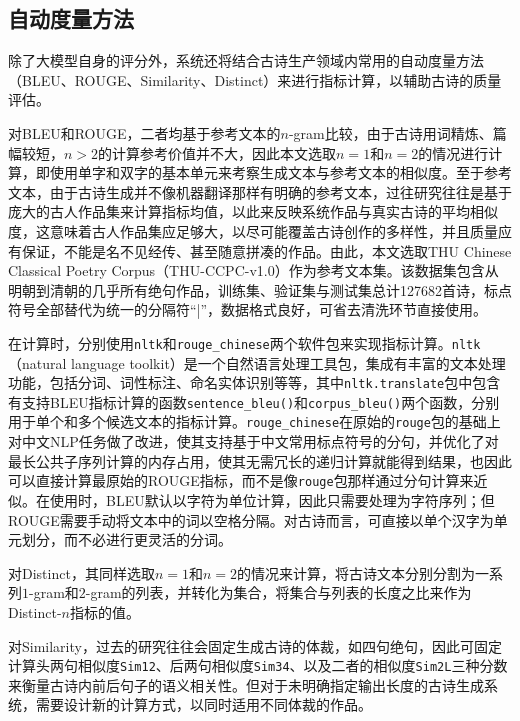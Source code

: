 \subsection{自动度量方法}

除了大模型自身的评分外，系统还将结合古诗生产领域内常用的自动度量方法（BLEU、ROUGE、Similarity、Distinct）来进行指标计算，以辅助古诗的质量评估。

对BLEU和ROUGE，二者均基于参考文本的$n$-gram比较，由于古诗用词精炼、篇幅较短，$n>2$的计算参考价值并不大，因此本文选取$n=1$和$n=2$的情况进行计算，即使用单字和双字的基本单元来考察生成文本与参考文本的相似度。至于参考文本，由于古诗生成并不像机器翻译那样有明确的参考文本，过往研究往往是基于庞大的古人作品集来计算指标均值，以此来反映系统作品与真实古诗的平均相似度，这意味着古人作品集应足够大，以尽可能覆盖古诗创作的多样性，并且质量应有保证，不能是名不见经传、甚至随意拼凑的作品。由此，本文选取THU Chinese Classical Poetry Corpus（THU-CCPC-v1.0）作为参考文本集。该数据集包含从明朝到清朝的几乎所有绝句作品，训练集、验证集与测试集总计127682首诗，标点符号全部替代为统一的分隔符“|”，数据格式良好，可省去清洗环节直接使用。

在计算时，分别使用\verb|nltk|和\verb|rouge_chinese|两个软件包来实现指标计算。\verb|nltk|（natural language toolkit）是一个自然语言处理工具包，集成有丰富的文本处理功能，包括分词、词性标注、命名实体识别等等，其中\verb|nltk.translate|包中包含有支持BLEU指标计算的函数\verb|sentence_bleu()|和\verb|corpus_bleu()|两个函数，分别用于单个和多个候选文本的指标计算。\verb|rouge_chinese|在原始的\verb|rouge|包的基础上对中文NLP任务做了改进，使其支持基于中文常用标点符号的分句，并优化了对最长公共子序列计算的内存占用，使其无需冗长的递归计算就能得到结果，也因此可以直接计算最原始的ROUGE指标，而不是像\verb|rouge|包那样通过分句计算来近似。在使用时，BLEU默认以字符为单位计算，因此只需要处理为字符序列；但ROUGE需要手动将文本中的词以空格分隔。对古诗而言，可直接以单个汉字为单元划分，而不必进行更灵活的分词。

对Distinct，其同样选取$n=1$和$n=2$的情况来计算，将古诗文本分别分割为一系列$1$-gram和$2$-gram的列表，并转化为集合，将集合与列表的长度之比来作为Distinct-$n$指标的值。

对Similarity，过去的研究往往会固定生成古诗的体裁，如四句绝句，因此可固定计算头两句相似度\verb|Sim12|、后两句相似度\verb|Sim34|、以及二者的相似度\verb|Sim2L|三种分数来衡量古诗内前后句子的语义相关性。但对于未明确指定输出长度的古诗生成系统，需要设计新的计算方式，以同时适用不同体裁的作品。

